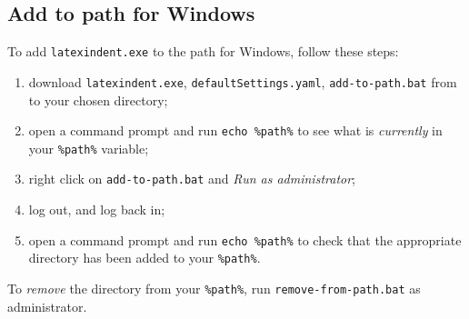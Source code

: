 \documentclass[11pt]{article}
\begin{document}
\subsection{Add to path for Windows}
 To add \lstinline!latexindent.exe! to the path for Windows, follow these steps:
 \begin{enumerate}
   \item download  \lstinline!latexindent.exe!, \lstinline!defaultSettings.yaml!,  \lstinline!add-to-path.bat! 
     from \cite{latexindent-home} to your chosen directory;
   \item open a command prompt and run \lstinline!echo %path%! to see what is \emph{currently} in your \lstinline!%path%! variable;
   \item right click on \lstinline!add-to-path.bat! and \emph{Run as administrator};
   \item log out, and log back in;
   \item open a command prompt and run \lstinline!echo %path%! to check that the appropriate directory has been added to your
     \lstinline!%path%!.
 \end{enumerate}
To \emph{remove} the directory from your \lstinline!%path%!, run \lstinline!remove-from-path.bat! as administrator.
\end{document}
